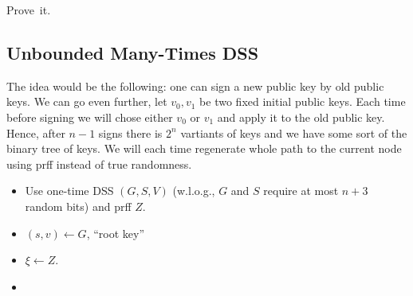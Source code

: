 \begin{exercise}
    Prove~it.
\end{exercise}

\subsection{Unbounded Many-Times DSS}

The idea would be the following: one can sign a new public key by old public keys.
We can go even further, let $v_0, v_1$ be two fixed initial public keys.
Each time before signing we will chose either $v_0$ or $v_1$ and apply it to the old public key.
Hence, after $n - 1$ signs there is  $2^{n}$ vartiants of keys and we have some sort of the binary tree of keys.
We will each time regenerate whole path to the current node using prff instead of true randomness.

\begin{itemize}
	\item Use one-time DSS $(G, S,V)$ (w.l.o.g., $G$ and $S$ require at most $n + 3$ random bits) and prff $Z$.
	\item $(s, v) \gets G$, “root key”
	\item $\xi \gets Z$.
	\item 
\end{itemize}
